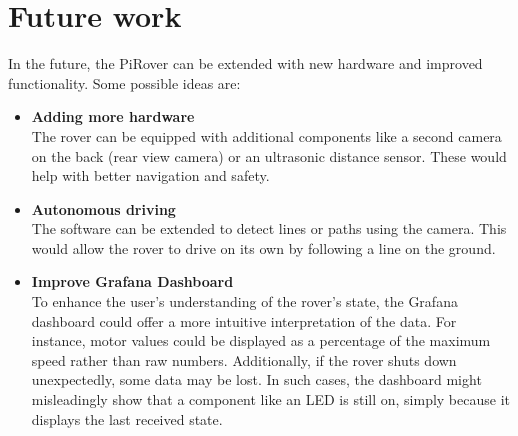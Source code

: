 \section{Future work}


In the future, the PiRover can be extended with new hardware and improved functionality. Some possible ideas are:

\begin{itemize}
    \item \textbf{Adding more hardware} \\
    The rover can be equipped with additional components like a second camera on the back (rear view camera) or an ultrasonic distance sensor. These would help with better navigation and safety.

    \item \textbf{Autonomous driving} \\
    The software can be extended to detect lines or paths using the camera. This would allow the rover to drive on its own by following a line on the ground.

    \item \textbf{Improve Grafana Dashboard} \\
    To enhance the user's understanding of the rover's state, the Grafana dashboard could offer a more intuitive interpretation of the data.
    For instance, motor values could be displayed as a percentage of the maximum speed rather than raw numbers.
    Additionally, if the rover shuts down unexpectedly, some data may be lost.
    In such cases, the dashboard might misleadingly show that a component like an LED is still on, simply because it displays the last received state.

\end{itemize}
